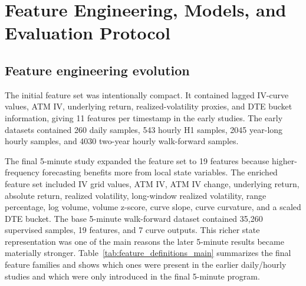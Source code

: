\documentclass[12pt]{report}
\begin{document}
\chapter{Feature Engineering, Models, and Evaluation Protocol}

\section{Feature engineering evolution}
The initial feature set was intentionally compact. It contained lagged IV-curve values, ATM IV, underlying return, realized-volatility proxies, and DTE bucket information, giving 11 features per timestamp in the early studies. The early datasets contained 260 daily samples, 543 hourly H1 samples, 2045 year-long hourly samples, and 4030 two-year hourly walk-forward samples.

The final 5-minute study expanded the feature set to 19 features because higher-frequency forecasting benefits more from local state variables. The enriched feature set included IV grid values, ATM IV, ATM IV change, underlying return, absolute return, realized volatility, long-window realized volatility, range percentage, log volume, volume z-score, curve slope, curve curvature, and a scaled DTE bucket. The base 5-minute walk-forward dataset contained 35,260 supervised samples, 19 features, and 7 curve outputs. This richer state representation was one of the main reasons the later 5-minute results became materially stronger. Table~\ref{tab:feature_definitions_main} summarizes the final feature families and shows which ones were present in the earlier daily/hourly studies and which were only introduced in the final 5-minute program.
\end{document}
